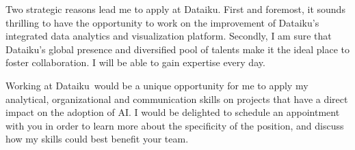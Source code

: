 \documentclass[11pt, a4paper]{awesome-cv}
\newcommand{\company}{Dataiku}
\begin{document}
\begin{cvletter}
Two strategic reasons lead me to apply at \company.    
First and foremost, it sounds thrilling to have the opportunity to work on the improvement of \company's integrated data analytics and visualization platform. 
Secondly, I am sure that \company's global presence and diversified pool of talents make it the ideal place to foster collaboration. I will be able to gain expertise every day. 

Working at \company~would be a unique opportunity for me to apply my analytical, organizational and communication skills on projects that have a direct impact on the adoption of AI.  
I would be delighted to schedule an appointment with you in order to learn more about the specificity of the position, and discuss how my skills could best benefit your team. 
\end{cvletter}


\makeletterclosing
\end{document}
